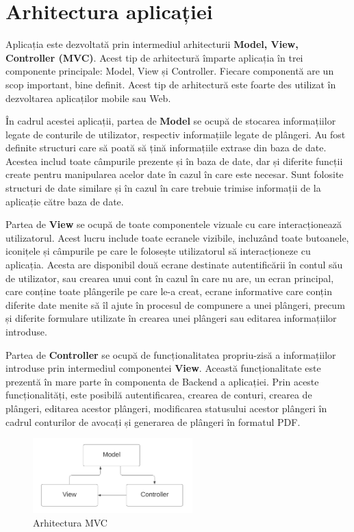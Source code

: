 \documentclass[12pt,a4paper]{report}
\theoremstyle{definition}
\theoremstyle{remark}
\begin{document}
\chapter{Arhitectura aplicației}
Aplicația este dezvoltată prin intermediul arhitecturii \textbf{Model, View, Controller (MVC)}. Acest tip de arhitectură împarte aplicația în trei componente principale: Model, View și Controller. Fiecare componentă are un scop important, bine definit. Acest tip de arhitectură este foarte des utilizat în dezvoltarea aplicaților mobile sau Web.

În cadrul acestei aplicații, partea de \textbf{Model} se ocupă de stocarea informațiilor legate de conturile de utilizator, respectiv informațiile legate de plângeri. Au fost definite structuri care să poată să țină informațiile extrase din baza de date. Acestea includ toate câmpurile prezente și în baza de date, dar și diferite funcții create pentru manipularea acelor date în cazul în care este necesar. Sunt folosite structuri de date similare și în cazul în care trebuie trimise informații de la aplicație către baza de date.

Partea de \textbf{View} se ocupă de toate componentele vizuale cu care interacționează utilizatorul. Acest lucru include toate ecranele vizibile, incluzând toate butoanele, iconițele și câmpurile pe care le folosește utilizatorul să interacționeze cu aplicația. Acesta are disponibil două ecrane destinate autentificării în contul său de utilizator, sau crearea unui cont în cazul în care nu are, un ecran principal, care conține toate plângerile pe care le-a creat, ecrane informative care conțin diferite date menite să îl ajute în procesul de compunere a unei plângeri, precum și diferite formulare utilizate în crearea unei plângeri sau editarea informațiilor introduse.

Partea de \textbf{Controller} se ocupă de funcționalitatea propriu-zisă a informațiilor introduse prin intermediul componentei \textbf{View}. Această funcționalitate este prezentă în mare parte în componenta de Backend a aplicației. Prin aceste funcționalități, este posibilă autentificarea, crearea de conturi, crearea de plângeri, editarea acestor plângeri, modificarea statusului acestor plângeri în cadrul conturilor de avocați și generarea de plângeri în formatul PDF.

\begin{figure}[H]
    	\centering
    	\includegraphics[width = 0.55\textwidth]{images/MVC}
	\caption{Arhitectura MVC}
\end{figure}
\newpage
\end{document}
